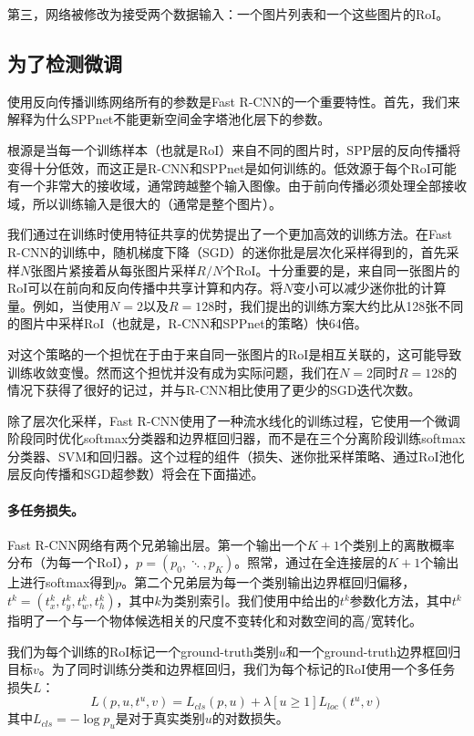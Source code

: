 \documentclass[../main]{subfile}
\begin{document}
第三，网络被修改为接受两个数据输入：一个图片列表和一个这些图片的RoI。

\subsection{为了检测微调}

使用反向传播训练网络所有的参数是Fast R-CNN的一个重要特性。首先，我们来解释为什么SPPnet不能更新空间金字塔池化层下的参数。

根源是当每一个训练样本（也就是RoI）来自不同的图片时，SPP层的反向传播将变得十分低效，而这正是R-CNN和SPPnet是如何训练的。低效源于每个RoI可能有一个非常大的接收域，通常跨越整个输入图像。由于前向传播必须处理全部接收域，所以训练输入是很大的（通常是整个图片）。

我们通过在训练时使用特征共享的优势提出了一个更加高效的训练方法。在Fast R-CNN的训练中，随机梯度下降（SGD）的迷你批是层次化采样得到的，首先采样$N$张图片紧接着从每张图片采样$R/N$个RoI。十分重要的是，来自同一张图片的RoI可以在前向和反向传播中共享计算和内存。将$N$变小可以减少迷你批的计算量。例如，当使用$N=2$以及$R=128$时，我们提出的训练方案大约比从128张不同的图片中采样RoI（也就是，R-CNN和SPPnet的策略）快64倍。

对这个策略的一个担忧在于由于来自同一张图片的RoI是相互关联的，这可能导致训练收敛变慢。然而这个担忧并没有成为实际问题，我们在$N=2$同时$R=128$的情况下获得了很好的记过，并与R-CNN相比使用了更少的SGD迭代次数。

除了层次化采样，Fast R-CNN使用了一种流水线化的训练过程，它使用一个微调阶段同时优化softmax分类器和边界框回归器，而不是在三个分离阶段训练softmax分类器、SVM和回归器。这个过程的组件（损失、迷你批采样策略、通过RoI池化层反向传播和SGD超参数）将会在下面描述。

\paragraph{多任务损失。}Fast R-CNN网络有两个兄弟输出层。第一个输出一个$K+1$个类别上的离散概率分布（为每一个RoI），$p=(p_0,\ddots, p_K)$。照常，通过在全连接层的$K+1$个输出上进行softmax得到$p$。第二个兄弟层为每一个类别输出边界框回归偏移，$t^k=(t_x^k, t_y^k, t_w^k, t_h^k)$，其中$k$为类别索引。我们使用\cite{rcnn}中给出的$t^k$参数化方法，其中$t^k$指明了一个与一个物体候选相关的尺度不变转化和对数空间的高/宽转化。

我们为每个训练的RoI标记一个ground-truth类别$u$和一个ground-truth边界框回归目标$v$。为了同时训练分类和边界框回归，我们为每个标记的RoI使用一个多任务损失$L$：
\begin{equation}
    L(p, u, t^u, v) = L_{cls}(p, u) + \lambda[u\ge1]L_{loc}(t^u, v)
\end{equation}
其中$L_{cls}=-\log p_u$是对于真实类别$u$的对数损失。
\end{document}
